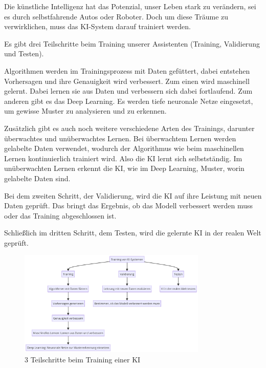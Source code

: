 \documentclass{report}
\begin{document}
Die künstliche Intelligenz hat das Potenzial, unser Leben stark zu verändern, sei es durch selbstfahrende Autos oder Roboter. Doch um diese Träume zu verwirklichen, muss das KI-System darauf trainiert werden.

\vspace{2mm}Es gibt drei Teilschritte beim Training unserer Assistenten (Training, Validierung und Testen). 

\vspace{2mm}Algorithmen werden im Trainingsprozess mit Daten gefüttert, dabei entstehen Vorhersagen und ihre Genauigkeit wird verbessert. Zum einen wird maschinell gelernt. Dabei lernen sie aus Daten und verbessern sich dabei fortlaufend. Zum anderen gibt es das Deep Learning. Es werden tiefe neuronale Netze eingesetzt, um gewisse Muster zu analysieren und zu erkennen.

\vspace{2mm}Zusätzlich gibt es auch noch weitere verschiedene Arten des Trainings, darunter überwachtes und unüberwachtes Lernen. Bei überwachtem Lernen werden gelabelte Daten verwendet, wodurch der Algorithmus wie beim maschinellen Lernen kontinuierlich trainiert wird. Also die KI lernt sich selbstständig. Im unüberwachten Lernen erkennt die KI, wie im Deep Learning, Muster, worin gelabelte Daten sind.

\vspace{2mm}Bei dem zweiten Schritt, der Validierung, wird die KI auf ihre Leistung mit neuen Daten geprüft. Das bringt das Ergebnis, ob das Modell verbessert werden muss oder das Training abgeschlossen ist.

\vspace{2mm}Schließlich im dritten Schritt, dem Testen, wird die gelernte KI in der realen Welt geprüft.

\citep{clickworker-de}


\begin{figure}[h]
    \centering 
    \includegraphics[width=0.8\textwidth]{diagram.png}
    \caption{3 Teilschritte beim Training einer KI}
    \end{figure}










\printbibliography
\end{document}
